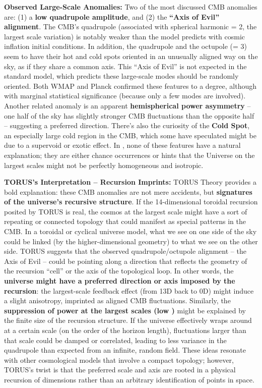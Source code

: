 \documentclass[
]{article}
\begin{document}
\textbf{Observed Large-Scale Anomalies:} Two of the most discussed CMB
anomalies are: (1) a \textbf{low quadrupole amplitude}, and (2) the
\textbf{``Axis of Evil'' alignment}. The CMB's quadrupole (associated
with spherical harmonic \ell = 2, the largest scale variation) is notably
weaker than the \LambdaCDM model predicts with cosmic inflation initial
conditions. In addition, the quadrupole and the octupole (\ell = 3) seem to
have their hot and cold spots oriented in an unusually aligned way on
the sky, as if they share a common axis. This ``Axis of Evil'' is not
expected in the standard model, which predicts these large-scale modes
should be randomly oriented. Both WMAP and Planck confirmed these
features to a degree, although with marginal statistical significance
(because only a few modes are involved). Another related anomaly is an
apparent \textbf{hemispherical power asymmetry} -- one half of the sky
has slightly stronger CMB fluctuations than the opposite half --
suggesting a preferred direction. There's also the curiosity of the
\textbf{Cold Spot}, an especially large cold region in the CMB, which
some have speculated might be due to a supervoid or exotic effect. In
\LambdaCDM, none of these features have a natural explanation; they are either
chance occurrences or hints that the Universe on the largest scales
might not be perfectly homogeneous and isotropic.

\textbf{TORUS's Interpretation -- Recursion Imprints:} TORUS Theory
provides a bold explanation: these CMB anomalies are not mere accidents,
but \textbf{signatures of the universe's recursive structure}. If the
14-dimensional toroidal recursion posited by TORUS is real, the cosmos
at the largest scale might have a sort of repeating or connected
topology that could manifest as special patterns in the CMB. In a
toroidal or cyclical universe model, what we see on one side of the sky
could be linked (by the higher-dimensional geometry) to what we see on
the other side. TORUS suggests that the observed quadrupole/octupole
alignment -- the Axis of Evil -- could be pointing along a direction
that reflects the geometry of the recursion ``cell'' or the axis of the
topological loop\hspace{0pt}. In other words, the \textbf{universe might
have a preferred direction or axis imposed by the recursion}: the
largest-scale feedback effect (from 13D back to 0D) might induce a
slight anisotropy, imprinted as aligned CMB fluctuations\hspace{0pt}.
Similarly, the \textbf{suppression of power at the largest scales (low
\ell)} might be explained by the finite size of the recursion structure. If
the universe effectively wraps around at a certain scale (on the order
of the horizon length), fluctuations larger than that scale could be
damped or correlated, leading to less variance in the quadrupole than
expected from an infinite, random field. These ideas resonate with other
cosmological models that involve a compact topology; however, TORUS's
twist is that the preferred scale and axis are rooted in a physical
recursion of dimensions rather than an arbitrary identification of
points in space.
\end{document}
